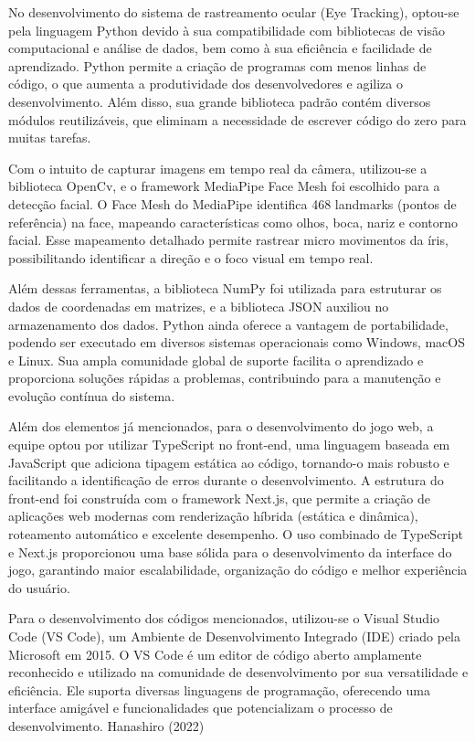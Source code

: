 No desenvolvimento do sistema de rastreamento ocular (Eye Tracking), optou-se pela
linguagem Python devido à sua compatibilidade com bibliotecas de visão computacional e
análise de dados, bem como à sua eficiência e facilidade de aprendizado. Python permite a
criação de programas com menos linhas de código, o que aumenta a produtividade dos
desenvolvedores e agiliza o desenvolvimento. Além disso, sua grande biblioteca padrão
contém diversos módulos reutilizáveis, que eliminam a necessidade de escrever código do
zero para muitas tarefas.

Com o intuito de capturar imagens em tempo real da câmera, utilizou-se a biblioteca OpenCv,
e o framework MediaPipe Face Mesh foi escolhido para a detecção facial. O Face Mesh do
MediaPipe identifica 468 landmarks (pontos de referência) na face, mapeando características
como olhos, boca, nariz e contorno facial. Esse mapeamento detalhado permite rastrear
micro movimentos da íris, possibilitando identificar a direção e o foco visual em tempo real.

Além dessas ferramentas, a biblioteca NumPy foi utilizada para estruturar os dados de
coordenadas em matrizes, e a biblioteca JSON auxiliou no armazenamento dos dados.
Python ainda oferece a vantagem de portabilidade, podendo ser executado em diversos
sistemas operacionais como Windows, macOS e Linux. Sua ampla comunidade global de
suporte facilita o aprendizado e proporciona soluções rápidas a problemas, contribuindo para
a manutenção e evolução contínua do sistema.

Além dos elementos já mencionados, para o desenvolvimento do jogo web, a equipe optou
por utilizar TypeScript no front-end, uma linguagem baseada em JavaScript que adiciona
tipagem estática ao código, tornando-o mais robusto e facilitando a identificação de erros
durante o desenvolvimento. A estrutura do front-end foi construída com o framework Next.js,
que permite a criação de aplicações web modernas com renderização híbrida (estática e
dinâmica), roteamento automático e excelente desempenho. O uso combinado de TypeScript
e Next.js proporcionou uma base sólida para o desenvolvimento da interface do jogo,
garantindo maior escalabilidade, organização do código e melhor experiência do usuário.

Para o desenvolvimento dos códigos mencionados, utilizou-se o Visual Studio Code (VS
Code), um Ambiente de Desenvolvimento Integrado (IDE) criado pela Microsoft em 2015. O
VS Code é um editor de código aberto amplamente reconhecido e utilizado na comunidade
de desenvolvimento por sua versatilidade e eficiência. Ele suporta diversas linguagens de
programação, oferecendo uma interface amigável e funcionalidades que potencializam o
processo de desenvolvimento. Hanashiro (2022)

